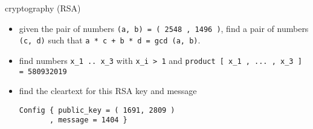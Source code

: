 \begin{slide}{cryptography (RSA)}

\begin{itemize}
\item
given the pair of numbers \verb|(a, b) = ( 2548 , 1496 )|,
find a pair of numbers \verb|(c, d)| 
such that  \verb|a * c + b * d = gcd (a, b)|.
\item
find numbers \verb|x_1 .. x_3| with \verb|x_i > 1|
and \verb|product [ x_1 , ... , x_3 ] = 580932019|
\item
find the cleartext for this RSA key and message
\begin{verbatim}
Config { public_key = ( 1691, 2809 ) 
       , message = 1404 }
\end{verbatim}
\end{itemize}




\end{slide}
